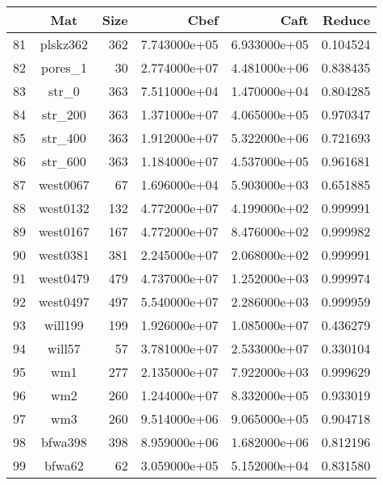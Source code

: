 \documentclass[8pt]{report}
\begin{document}
	\begin{table*}
	\center
		\begin{tabular}{|l|c|r|r|r|r|}
\toprule
{} &                      Mat &  Size &          Cbef &          Caft &    Reduce \\
\midrule
81  &                 plskz362 &   362 &  7.743000e+05 &  6.933000e+05 &  0.104524 \\
82  &                  pores\_1 &    30 &  2.774000e+07 &  4.481000e+06 &  0.838435 \\
83  &                    str\_0 &   363 &  7.511000e+04 &  1.470000e+04 &  0.804285 \\
84  &                  str\_200 &   363 &  1.371000e+07 &  4.065000e+05 &  0.970347 \\
85  &                  str\_400 &   363 &  1.912000e+07 &  5.322000e+06 &  0.721693 \\
86  &                  str\_600 &   363 &  1.184000e+07 &  4.537000e+05 &  0.961681 \\
87  &                 west0067 &    67 &  1.696000e+04 &  5.903000e+03 &  0.651885 \\
88  &                 west0132 &   132 &  4.772000e+07 &  4.199000e+02 &  0.999991 \\
89  &                 west0167 &   167 &  4.772000e+07 &  8.476000e+02 &  0.999982 \\
90  &                 west0381 &   381 &  2.245000e+07 &  2.068000e+02 &  0.999991 \\
91  &                 west0479 &   479 &  4.737000e+07 &  1.252000e+03 &  0.999974 \\
92  &                 west0497 &   497 &  5.540000e+07 &  2.286000e+03 &  0.999959 \\
93  &                  will199 &   199 &  1.926000e+07 &  1.085000e+07 &  0.436279 \\
94  &                   will57 &    57 &  3.781000e+07 &  2.533000e+07 &  0.330104 \\
95  &                      wm1 &   277 &  2.135000e+07 &  7.922000e+03 &  0.999629 \\
96  &                      wm2 &   260 &  1.244000e+07 &  8.332000e+05 &  0.933019 \\
97  &                      wm3 &   260 &  9.514000e+06 &  9.065000e+05 &  0.904718 \\
98  &                  bfwa398 &   398 &  8.959000e+06 &  1.682000e+06 &  0.812196 \\
99  &                   bfwa62 &    62 &  3.059000e+05 &  5.152000e+04 &  0.831580 \\

\end{tabular}
\end{table*}
\end{document}
